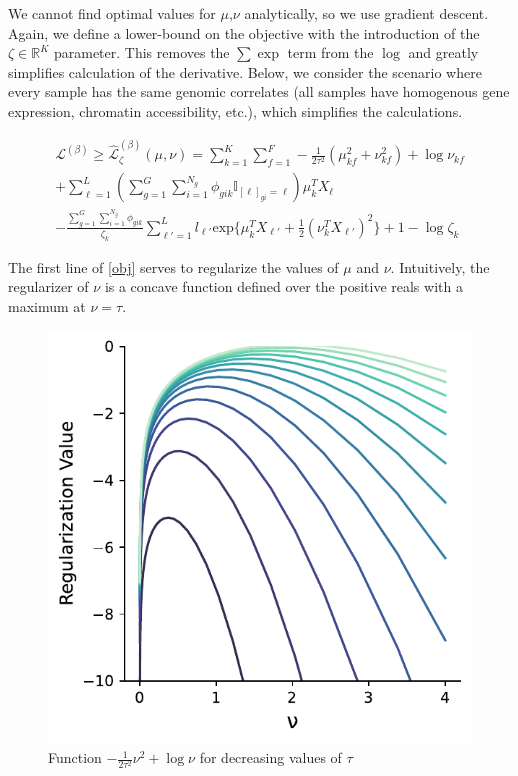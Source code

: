 \documentclass{article}
\newcommand{\Lagr}{\mathcal{L}}
\begin{document}
We cannot find optimal values for $\mu$,$\nu$ analytically, so we use gradient descent. Again, we define a lower-bound on the objective with the introduction of the $\zeta \in \mathbb{R}^K$ parameter. This removes the $\sum\exp$ term from the $\log$ and greatly simplifies calculation of the derivative. Below, we consider the scenario where every sample has the same genomic correlates (all samples have homogenous gene expression, chromatin accessibility, etc.), which simplifies the calculations. 

\begin{equation} \label{obj}
\begin{split}
\Lagr^{(\beta)} \geq \hat{\Lagr}^{(\beta)}_{\zeta}(\mu,\nu) = \sum_{k=1}^{K}\sum_{f=1}^F  -\frac{1}{2\tau^2}(\mu_{kf}^2 + \nu_{kf}^2) + \log{\nu_{kf}} \\
	+ \sum_{\ell=1}^L \left(\sum_{g=1}^G\sum_{i=1}^{N_g} \phi_{gik} \mathbb{I}_{[\ell]_{gi} = \ell} \right) \mu_k^T X_{\ell} \\
	- \frac{ \sum_{g=1}^G\sum_{i=1}^{N_g} \phi_{gik} }{\zeta_k}  \sum_{\ell'=1}^L l_{\ell'}\textrm{exp}\{ \mu_k^T X_{\ell'} + \frac{1}{2}(\nu_k^T X_{\ell'})^2\} + 1 - \log{\zeta_k}
\end{split}
\end{equation}

The first line of \eqref{obj} serves to regularize the values of $\mu$ and $\nu$. Intuitively, the regularizer of $\nu$ is a concave function defined over the positive reals with a maximum at $\nu = \tau$. 

\begin{figure}[h]
\caption{Function $-\frac{1}{2\tau^2}\nu^2 + \log\nu$ for decreasing values of $\tau$}
\centering
\includegraphics[scale=0.65]{nu_regularization.pdf}
\end{figure}
\end{document}
